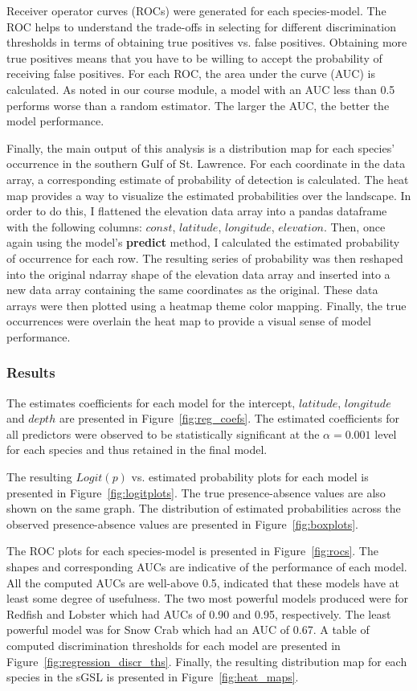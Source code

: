Receiver operator curves (ROCs) were generated for each species-model.
The ROC helps to understand the trade-offs in selecting for different discrimination thresholds in terms of obtaining true positives vs.
false positives.
Obtaining more true positives means that you have to be willing to accept the probability of receiving false positives.
For each ROC, the area under the curve (AUC) is calculated.
As noted in our course module, a model with an AUC less than 0.5 performs worse than a random estimator.
The larger the AUC, the better the model performance.

Finally, the main output of this analysis is a distribution map for each species' occurrence in the southern Gulf of St. Lawrence.
For each coordinate in the data array, a corresponding estimate of probability of detection is calculated.
The heat map provides a way to visualize the estimated probabilities over the landscape.
In order to do this, I flattened the elevation data array into a pandas dataframe with the following columns:
$const$, $latitude$, $longitude$, $elevation$.
Then, once again using the model's \textbf{predict} method, I calculated the estimated probability of occurrence for each row.
The resulting series of probability was then reshaped into the original ndarray shape of the elevation data array and inserted into a
new data array containing the same coordinates as the original.
These data arrays were then plotted using a heatmap theme color mapping.
Finally, the true occurrences were overlain the heat map to provide a visual sense of model performance.


\subsubsection{Results}

The estimates coefficients for each model for the intercept, $latitude$, $longitude$ and $depth$ are presented in Figure~\ref{fig:reg_coefs}.
The estimated coefficients for all predictors were observed to be statistically significant at the $\alpha=0.001$ level for each species
and thus retained in the final model.

The resulting $Logit(p)$ vs. estimated probability plots for each model is presented in Figure~\ref{fig:logitplots}.
The true presence-absence values are also shown on the same graph.
The distribution of estimated probabilities across the observed presence-absence values are presented in Figure~\ref{fig:boxplots}.

The ROC plots for each species-model is presented in Figure~\ref{fig:rocs}.
The shapes and corresponding AUCs are indicative of the performance of each model.
All the computed AUCs are well-above 0.5, indicated that these models have at least some degree of usefulness.
The two most powerful models produced were for Redfish and Lobster which had AUCs of 0.90 and 0.95, respectively.
The least powerful model was for Snow Crab which had an AUC of 0.67.
A table of computed discrimination thresholds for each model are presented in Figure~\ref{fig:regression_discr_ths}.
Finally, the resulting distribution map for each species in the sGSL is presented in Figure~\ref{fig:heat_maps}.


